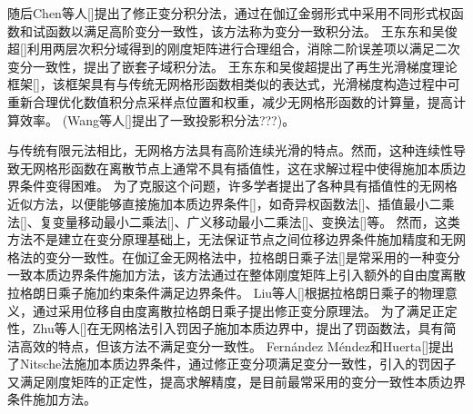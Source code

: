 随后Chen等人[]提出了修正变分积分法，通过在伽辽金弱形式中采用不同形式权函数和试函数以满足高阶变分一致性，该方法称为变分一致积分法。
王东东和吴俊超[]利用两层次积分域得到的刚度矩阵进行合理组合，消除二阶误差项以满足二次变分一致性，提出了嵌套子域积分法。
王东东和吴俊超提出了再生光滑梯度理论框架[]，该框架具有与传统无网格形函数相类似的表达式，光滑梯度构造过程中可重新合理优化数值积分点采样点位置和权重，减少无网格形函数的计算量，提高计算效率。
(Wang等人[]提出了一致投影积分法???)。\par
与传统有限元法相比，无网格方法具有高阶连续光滑的特点。然而，这种连续性导致无网格形函数在离散节点上通常不具有插值性，这在求解过程中使得施加本质边界条件变得困难。
为了克服这个问题，许多学者提出了各种具有插值性的无网格近似方法，以便能够直接施加本质边界条件[]，如奇异权函数法[]、插值最小二乘法[]、复变量移动最小二乘法[]、广义移动最小二乘法[]、变换法[]等。
然而，这类方法不是建立在变分原理基础上，无法保证节点之间位移边界条件施加精度和无网格法的变分一致性。在伽辽金无网格法中，拉格朗日乘子法[]是常采用的一种变分一致本质边界条件施加方法，该方法通过在整体刚度矩阵上引入额外的自由度离散拉格朗日乘子施加约束条件满足边界条件。
Liu等人[]根据拉格朗日乘子的物理意义，通过采用位移自由度离散拉格朗日乘子提出修正变分原理法。
为了满足正定性，Zhu等人[]在无网格法引入罚因子施加本质边界中，提出了罚函数法，具有简洁高效的特点，但该方法不满足变分一致性。
Fernández Méndez和Huerta[]提出了Nitsche法施加本质边界条件，通过修正变分项满足变分一致性，引入的罚因子又满足刚度矩阵的正定性，提高求解精度，是目前最常采用的变分一致性本质边界条件施加方法。
